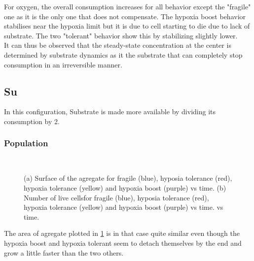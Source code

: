 \documentclass[11pt,a4paper]{article}
\begin{document}
For oxygen, the overall consumption increases for all behavior except the "fragile" one as it is the only one that does not compensate. The hypoxia boost behavior stabilises near the hypoxia limit but it is due to cell starting to die due to lack of substrate. The two "tolerant" behavior show this by stabilizing slightly lower.\\

It can thus be observed that the steady-state concentration at the center is determined by substrate dynamics as it the substrate that can completely stop consumption in an irreversible manner.\\


\subsection{Su}
In this configuration, Substrate is made more available by dividing its consumption by 2.

\subsubsection{Population}
\begin{figure}[h]
\begin{subfigure}{0.5\textwidth}
	\centering
	
	\caption{ \label{Su_OS_area}}
\end{subfigure}
~~
\begin{subfigure}{0.5\textwidth}
	\centering
	
	\caption{\label{Su_OS_live}}
\end{subfigure}
\caption{(a) Surface of the agregate for fragile (blue), hyposia tolerance (red), hypoxia tolerance (yellow) and hypoxia boost (purple) vs time. (b) Number of live cellsfor fragile (blue), hyposia tolerance (red), hypoxia tolerance (yellow) and hypoxia boost (purple) vs time. vs time. \label{Su_OS_area_live}}
\end{figure}

The area of agregate plotted in \ref{Su_OS_area} is in that case quite similar even though the hypoxia boost and hypoxia tolerant seem to detach themselves by the end and grow a little faster than the two others.\\
\end{document}
